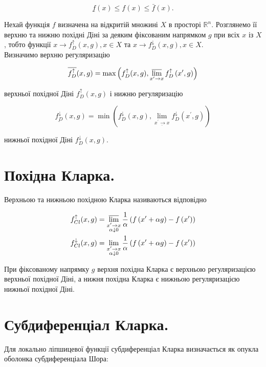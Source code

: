 \documentclass[10pt]{article}
\begin{document}
$$
\underline{f}(x) \leq f(x) \leq \bar{f}(x) .
$$

Нехай функція $f$ визначена на відкритій множині $X$ в просторі $\mathbb{R}^{n}$. Розглянемо її верхню та нижню похідні Діні за деяким фіксованим напрямком $g$ при всіх $x$ із $X$, тобто функції $x \rightarrow f_{D}^{\uparrow}(x, g), x \in X$ та $x \rightarrow f_{D}^{\downarrow}(x, g), x \in X$.\\
Визначимо верхню регуляризацію

$$
\overline{f_{D}^{\uparrow}}(x, g)=\max \left(f_{D}^{\uparrow}(x, g), \varlimsup_{x^{\prime} \rightarrow x} f_{D}^{\uparrow}\left(x^{\prime}, g\right)\right)
$$

верхньої похідної Діні $f_{D}^{\uparrow}(x, g)$ і нижню регуляризацію

$$
\underline{f_{D}^{\downarrow}}(x, g)=\min \left(f_{D}^{\downarrow}(x, g), \lim _{\underline{x^{\prime} \rightarrow x}} f_{D}^{\downarrow}\left(x^{\prime}, g\right)\right)
$$

нижньої похідної Діні $f_{D}^{\downarrow}(x, g)$.

\section*{Похідна Кларка.}
Верхньою та нижньою похідною Кларка називаються відповідно

$$
\begin{aligned}
f_{C l}^{\uparrow}(x, g) & =\varlimsup_{\substack{x^{\prime} \rightarrow x \\
\alpha \downarrow 0}} \frac{1}{\alpha}\left(f\left(x^{\prime}+\alpha g\right)-f\left(x^{\prime}\right)\right) \\
f_{C l}^{\downarrow}(x, g) & =\lim _{\substack{x^{\prime} \rightarrow x \\
\alpha \downarrow 0}} \frac{1}{\alpha}\left(f\left(x^{\prime}+\alpha g\right)-f\left(x^{\prime}\right)\right)
\end{aligned}
$$

При фіксованому напрямку $g$ верхня похідна Кларка є верхньою регуляризацією верхньої похідної Діні, а нижня похідна Кларка є нижньою регуляризацією нижньої похідної Діні.

\section*{Субдиференціал Кларка.}
Для локально ліпшицевої функції субдиференціал Кларка визначається як опукла оболонка субдиференціала Шора:
\end{document}
